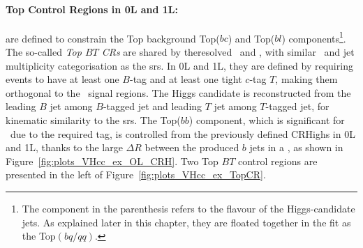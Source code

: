 \paragraph{Top Control Regions in 0L and 1L:} are defined to constrain the Top background Top($bc$) and Top($bl$) components\footnote{The component in the parenthesis refers to the flavour of the Higgs-candidate jets. As explained later in this chapter, they are floated together in the fit as the Top$(bq/qq)$.}. The so-called \textit{Top $BT$ CRs} are shared by theresolved \vhb\ and \vhc, with similar \ptv\ and jet multiplicity categorisation as the \gls{sr}s. In 0L and 1L, they are defined by requiring events to have at least one $B$-tag and at least one tight $c$-tag $T$, making them orthogonal to the \vhb\ signal regions. The Higgs candidate is reconstructed from the leading $B$ jet among $B$-tagged jet and leading $T$ jet among $T$-tagged jet, for kinematic similarity to the \gls{sr}s. The Top($bb$) component, which is significant for \vhb\ due to the required tag, is controlled from the previously defined CRHighs in 0L and 1L, thanks to the large $\Delta R$ between the produced $b$ jets in a \ttb, as shown in Figure~\ref{fig:plots_VHcc_ex_OL_CRH}. Two Top $BT$ control regions are presented in the left of Figure~\ref{fig:plots_VHcc_ex_TopCR}.

